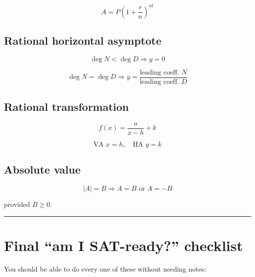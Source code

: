 \documentclass[
]{article}
\begin{document}
\[
\boxed{
A=P\left(1+\frac rn\right)^{nt}
}
\]

\subsection{Rational horizontal
asymptote}\label{rational-horizontal-asymptote}

\[
\boxed{
\deg N<\deg D\Rightarrow y=0
}
\]

\[
\boxed{
\deg N=\deg D
\Rightarrow
y=\frac{\text{leading coeff. }N}
{\text{leading coeff. }D}
}
\]

\subsection{Rational transformation}\label{rational-transformation}

\[
\boxed{f(x)=\frac a{x-h}+k}
\]

\[
\boxed{\text{VA }x=h,\quad\text{HA }y=k}
\]

\subsection{Absolute value}\label{absolute-value}

\[
\boxed{|A|=B\Rightarrow A=B\text{ or }A=-B}
\]

provided \(B\ge0\).

\begin{center}\rule{0.5\linewidth}{0.5pt}\end{center}

\section{Final ``am I SAT-ready?''
checklist}\label{final-am-i-sat-ready-checklist}

You should be able to do every one of these without needing notes:
\end{document}
